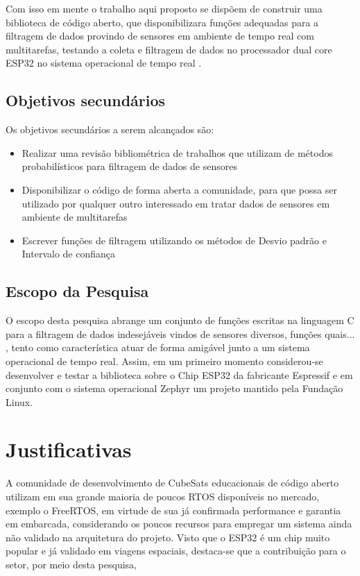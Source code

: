 Com isso em mente o trabalho aqui proposto se dispõem de construir uma biblioteca de código aberto, que disponibilizara funções adequadas para a filtragem de dados provindo de sensores em ambiente de tempo real com multitarefas, testando a coleta e filtragem de dados no processador dual core ESP32 no sistema operacional de tempo real \cite{Zephyr}.

\subsection{Objetivos secundários}
Os objetivos secundários a serem alcançados são:
\begin{itemize}
\item Realizar uma revisão bibliométrica de trabalhos que utilizam de métodos probabilísticos para filtragem de dados de sensores
\item Disponibilizar o código de forma aberta a comunidade, para que possa ser utilizado por qualquer outro interessado em tratar dados de sensores em ambiente de multitarefas
\item Escrever funções de filtragem utilizando os métodos de Desvio padrão e Intervalo de confiança
\end{itemize}


\subsection{Escopo da Pesquisa}
O escopo desta pesquisa abrange um conjunto de funções escritas na linguagem C para a filtragem de dados indesejáveis vindos de sensores diversos, funções quais... %
, tento como característica atuar de forma amigável junto a um sistema operacional de tempo real. Assim, em um primeiro momento considerou-se desenvolver e testar a biblioteca sobre o Chip ESP32 da fabricante Espressif e em conjunto com o sistema operacional Zephyr um projeto mantido pela Fundação Linux.  


\section{Justificativas}
A comunidade de desenvolvimento de CubeSats educacionais de código aberto utilizam em sua grande maioria de 
poucos RTOS disponíveis no mercado, exemplo o FreeRTOS, em virtude de sua já confirmada performance e garantia 
em embarcada, considerando os poucos recursos para empregar um sistema ainda não validado na arquitetura do 
projeto.
Visto que o ESP32 é um chip muito popular e já validado em viagens espaciais, destaca-se que 
a contribuição para o setor, por meio desta pesquisa, 


